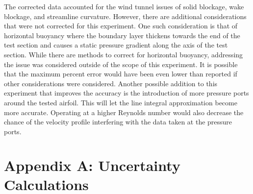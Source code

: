 \documentclass[journal,letterpaper]{IEEEtran}
\begin{document}
The corrected data accounted for the wind tunnel issues of solid blockage, wake blockage, and streamline curvature.
However, there are additional considerations that were not corrected for this experiment.
One such consideration is that of horizontal buoyancy where the boundary layer thickens towards the end of the test section and causes a static pressure gradient along the axis of the test section.
While there are methods to correct for horizontal buoyancy, addressing the issue was considered outside of the scope of this experiment.
It is possible that the maximum percent error would have been even lower than reported if other considerations were considered.
Another possible addition to this experiment that improves the accuracy is the introduction of more pressure ports around the tested airfoil.
This will let the line integral approximation become more accurate.
Operating at a higher Reynolds number would also decrease the chance of the velocity profile interfering with the data taken at the pressure ports.


\section*{Appendix A: Uncertainty Calculations}
\end{document}
